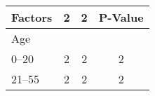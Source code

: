 \documentclass{article}
\newcommand*{\tabindent}{\hspace{3mm}} %
\begin{document}
\noindent
\begin{tabular}{@{}lccc@{}}
	\toprule
	Factors            & 2 & 2 & P-Value \\
	\midrule
	Age                                  \\
	\tabindent 0--20  & 2 & 2 & 2       \\
	\tabindent 21--55 & 2 & 2 & 2       \\
	\bottomrule
\end{tabular}
\end{document}
